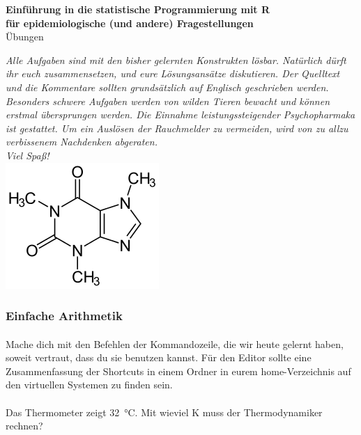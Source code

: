 \documentclass[paper=A4, pagesize, DIV=calc, smallheadings,
fontsize=11pt, expansion=false]{scrreprt}
\begin{document}
\pagestyle{empty}
\LARGE
\begin{center}
\textbf{Einführung in die statistische Programmierung mit R}\\
\Large\textbf{für epidemiologische (und andere) Fragestellungen}\\
\large{Übungen}
\end{center}
\normalsize
\textit{Alle Aufgaben sind mit den bisher gelernten Konstrukten lösbar. Natürlich dürft ihr euch zusammensetzen, und eure Lösungsansätze diskutieren.
Der Quelltext und die Kommentare sollten grundsätzlich auf Englisch geschrieben werden. 
Besonders schwere Aufgaben werden von wilden Tieren bewacht und können erstmal übersprungen werden.
Die Einnahme leistungssteigender Psychopharmaka ist gestattet. Um ein Auslösen der Rauchmelder zu vermeiden, wird von zu allzu verbissenem Nachdenken abgeraten.\\
Viel Spaß!
}\\
\vspace{2em}\hspace*{30em}
\includegraphics[width=0.1\linewidth]{./imgs/Caffeine.png}
\large\textsl{}
\normalsize
{}
\subsubsection*{Einfache Arithmetik}
\paragraph{}
Mache dich mit den Befehlen der Kommandozeile, die wir heute gelernt haben, soweit vertraut, dass du sie 
benutzen kannst. Für den Editor sollte eine Zusammenfassung der Shortcuts in einem Ordner in eurem home-Verzeichnis auf 
den virtuellen Systemen zu finden sein.%

\paragraph{}
Das Thermometer zeigt \SI{32}{\degreeCelsius}. Mit wieviel \si{K} muss der Thermodynamiker rechnen?
\end{document}
